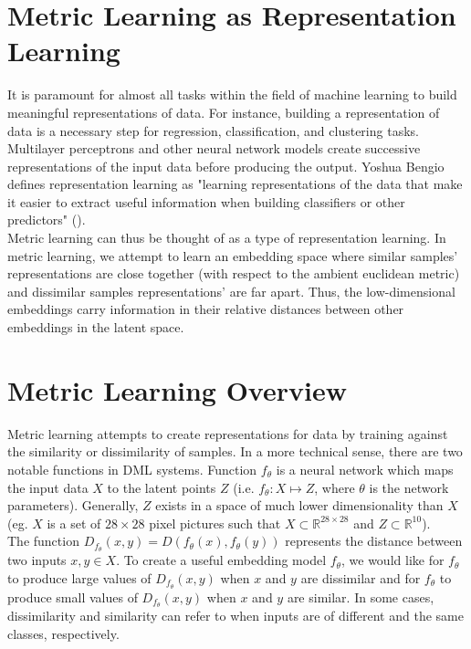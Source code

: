 \documentclass[./dissertation.tex]{subfiles}
\begin{document}
    
    \section{Metric Learning as Representation Learning}
    It is paramount for almost all tasks within the field of machine learning to build meaningful representations of data. For instance, building a representation of data is a necessary step for regression, classification, and clustering tasks. Multilayer perceptrons and other neural network models create successive representations of the input data before producing the output. Yoshua Bengio defines representation learning as "learning representations of the data that make it easier to extract useful information when building classifiers or other predictors" (\citeyear{bengio2013representation}).\\
    
    Metric learning can thus be thought of as a type of representation learning. In metric learning, we attempt to learn an embedding space where similar samples' representations are close together (with respect to the ambient euclidean metric) and dissimilar samples representations' are far apart. Thus, the low-dimensional embeddings carry information in their relative distances between other embeddings in the latent space. 

    \section{Metric Learning Overview}
    Metric learning attempts to create representations for data by training against the similarity or dissimilarity of samples. In a more technical sense, there are two notable functions in DML systems. Function $f_{\theta}$ is a neural network which maps the input data $X$ to the latent points $Z$ (i.e. $f_{\theta}: X \mapsto Z$, where $\theta$ is the network parameters). Generally, $Z$ exists in a space of much lower dimensionality than $X$ (eg. $X$ is a set of $28 \times 28$ pixel pictures such that $X \subset \mathbb{R}^{28 \times 28}$ and $Z \subset \mathbb{R}^{10}$).\\
    
    The function $D_{f_{\theta}}(x, y) = D(f_{\theta}(x), f_{\theta}(y))$ represents the distance between two inputs $x, y \in X$. To create a useful embedding model $f_{\theta}$, we would like for $f_{\theta}$ to produce large values of $D_{f_{\theta}}(x, y)$ when $x$ and $y$ are dissimilar and for $f_{\theta}$ to produce small values of $D_{f_{\theta}}(x, y)$ when $x$ and $y$ are similar. In some cases, dissimilarity and similarity can refer to when inputs are of different and the same classes, respectively. \\
    
\end{document}

